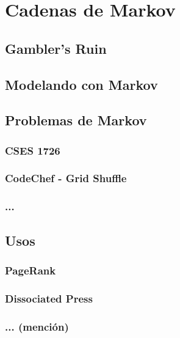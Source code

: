 \documentclass[../main.tex]{subfiles}
\begin{document}
\section{Cadenas de Markov}
\subsection{Gambler's Ruin}

\subsection{Modelando con Markov}

\subsection{Problemas de Markov}
\subsubsection{CSES 1726}
\subsubsection{CodeChef - Grid Shuffle}
\subsubsection{...}

\subsection{Usos}
\subsubsection{PageRank}
\subsubsection{Dissociated Press}
\subsubsection{... (mención)}
\end{document}
